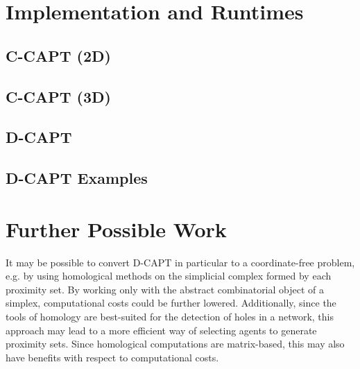 \documentclass[11pt]{article}
\begin{document}
\section{Implementation and Runtimes}
\subsection{C-CAPT (2D)}
\subsection{C-CAPT (3D)}
\subsection{D-CAPT}

\subsection{D-CAPT Examples}




\section{Further Possible Work}
It may be possible to convert D-CAPT in particular to a coordinate-free problem, e.g. by using homological methods on the simplicial complex formed by each proximity set. By working only with the abstract combinatorial object of a simplex, computational costs could be further lowered. Additionally, since the tools of homology are best-suited for the detection of holes in a network, this approach may lead to a more efficient way of selecting agents to generate proximity sets. Since homological computations are matrix-based, this may also have benefits with respect to computational costs.
\end{document}

